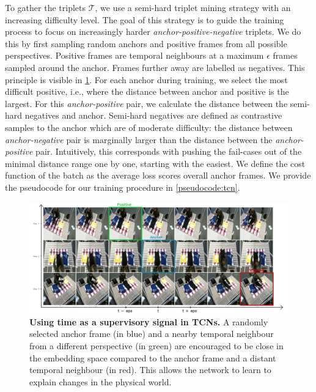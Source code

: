 \documentclass[\home/main.tex]{subfiles}
\begin{document}
To gather the triplets $\mathcal{T}$, we use a semi-hard triplet mining strategy with an increasing difficulty level. The goal of this strategy is to guide the training process to focus on increasingly harder \textit{anchor-positive-negative} triplets. We do this by first sampling random anchors and positive frames from all possible perspectives. Positive frames are temporal neighbours at a maximum $\epsilon$ frames sampled around the anchor. Frames further away are labelled as negatives. This principle is visible in \cref{fig:rewards_triplet_mining}. For each anchor during training, we select the most difficult positive, i.e., where the distance between anchor and positive is the largest. For this \textit{anchor-positive} pair, we calculate the distance between the semi-hard negatives and anchor. Semi-hard negatives are defined as contrastive samples to the anchor which are of moderate difficulty: the distance between \textit{anchor-negative} pair is marginally larger than the distance between the \textit{anchor-positive} pair. Intuitively, this corresponds with pushing the fail-cases out of the minimal distance range one by one, starting with the easiest. We define the cost function of the batch as the average loss scores overall anchor frames. We provide the pseudocode for our training procedure in \cref{pseudocode:tcn}.

\begin{figure}
    \centering
    \includegraphics[width=\textwidth, keepaspectratio]{figures/figs_tcn_sampling.jpg}
    \caption[Principle of using time as a supervisory signal.]{\textbf{Using time as a supervisory signal in TCNs.} A randomly selected anchor frame (in blue) and a nearby temporal neighbour from a different perspective (in green) are encouraged to be close in the embedding space compared to the anchor frame and a distant temporal neighbour (in red). This allows the network to learn to explain changes in the physical world.}
    \label{fig:rewards_triplet_mining}
\end{figure}
\end{document}
